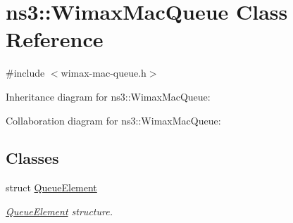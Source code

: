 \hypertarget{classns3_1_1WimaxMacQueue}{}\section{ns3\+:\+:Wimax\+Mac\+Queue Class Reference}
\label{classns3_1_1WimaxMacQueue}


{\ttfamily \#include $<$wimax-\/mac-\/queue.\+h$>$}



Inheritance diagram for ns3\+:\+:Wimax\+Mac\+Queue\+:


Collaboration diagram for ns3\+:\+:Wimax\+Mac\+Queue\+:
\subsection*{Classes}
\begin{DoxyCompactItemize}
\item 
struct \hyperlink{structns3_1_1WimaxMacQueue_1_1QueueElement}{Queue\+Element}
\begin{DoxyCompactList}\small\item\em \hyperlink{structns3_1_1WimaxMacQueue_1_1QueueElement}{Queue\+Element} structure. \end{DoxyCompactList}\end{DoxyCompactItemize}

